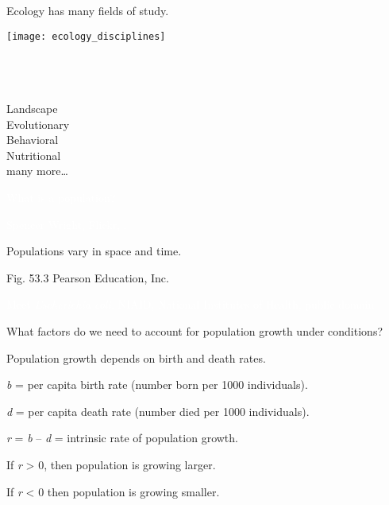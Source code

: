 \documentclass[t,handout]{beamer}  %
\begin{document}
%
\begin{frame}[t]{Ecology has many fields of study.}
	\begin{minipage}[t]{0.6\textwidth}
		\vspace{0pt}
		\texttt{[image: ecology\_disciplines]}
	\end{minipage}
	\hfill
	\begin{minipage}[t]{0.3\textwidth}
		\vspace{0pt}
		\\
		\\
		\\
		Landscape\\
		Evolutionary\\
		Behavioral\\
		Nutritional\\
		many more\dots
	\end{minipage}	
\end{frame}
%
{
\begin{frame}[b]{\textcolor{white}{What is a population?}}

	\tiny\textcolor{white}{Spencer Wright, Flickr, .}
\end{frame}
}
%
{
\begin{frame}[b]{Populations vary in space and time.}

	\hfill \tiny Fig. 53.3 \textcopyright Pearson Education, Inc.
\end{frame}
}
%
{
\begin{frame}[b]{\textcolor{white}{Meet \textit{Escherichia coli.}}}
	\tiny \hfill \textcolor{white}{NIAID, National Institutes of Health, public domain.}%
\end{frame}
}
%
\begin{frame}{}
	\hangpara\Large What factors do we need to account for population growth under  conditions? 
\end{frame}
%
\begin{frame}{Population growth depends on birth and death rates.}

	\hangpara \textit{b} = per capita birth rate (number born per 1000 individuals). \pause
	
	\hangpara \textit{d} = per capita death rate (number died per 1000 individuals). \pause
	
	\hangpara \textit{r} = \textit{b} – \textit{d} = intrinsic rate of population growth. \pause
	
	\hangpara If \textit{r} \textgreater{} 0, then population is growing larger.
	
	\hangpara If \textit{r} \textless{} 0 then population is growing smaller.
	
	
\end{frame}
\end{document}
